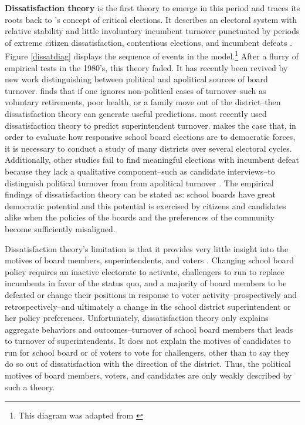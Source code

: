 \textbf{Dissatisfaction theory} is the first theory to emerge in this period and 
traces its roots back to  \citet{RefWorks:348}'s concept of critical elections. 
It describes an electoral system with relative stability and little involuntary 
incumbent turnover punctuated by periods of extreme citizen dissatisfaction, 
contentious elections, and incumbent defeats \citep{RefWorks:297,RefWorks:271}. 
Figure \ref{dissatdiag} displays the sequence of events in the model.\footnote{This 
diagram was adapted from \citep{RefWorks:243}} After a flurry of empirical tests in 
the 1980's, this theory faded. It has recently been revived by new work distinguishing 
between political and apolitical sources of board turnover. \citet{RefWorks:311} 
finds that if one ignores non-political cases of turnover--such as voluntary 
retirements, poor health, or a family move out of the district--then 
dissatisfaction theory can generate useful predictions. \citet{RefWorks:311} most 
recently used dissatisfaction theory to predict superintendent turnover. 
\citet{RefWorks:345} makes the case that, in order to evaluate how responsive 
school board elections are to democratic forces, it is necessary to conduct a study 
of many districts over several electoral cycles. Additionally, other studies fail 
to find meaningful elections with incumbent defeat because they lack a qualitative 
component--such as candidate interviews--to distinguish political turnover from 
from apolitical turnover \citep{RefWorks:311}. The empirical findings of dissatisfaction 
theory can be stated as: school boards have great democratic potential and this 
potential is exercised by citizens and candidates alike when the policies of the 
boards and the preferences of the community become sufficiently misaligned. 

Dissatisfaction theory's limitation is that it provides very little insight into 
the motives of board members, superintendents, and voters \citep{RefWorks:336}. 
Changing school board policy requires an inactive electorate to activate, 
challengers to run to replace incumbents in favor of the status quo, and a majority 
of board members to be defeated or change their positions in response to voter 
activity--prospectively and retrospectively--and ultimately a change in the school 
district superintendent or her policy preferences. Unfortunately, dissatisfaction 
theory only explains aggregate behaviors and outcomes--turnover of school board members
that leads to turnover of superintendents. It does not explain the motives of 
candidates to run for school board or of voters to vote for challengers, other 
than to say they do so out of dissatisfaction with the direction of the district. 
Thus, the political motives of board members, voters, and candidates are only 
weakly described by such a theory.

